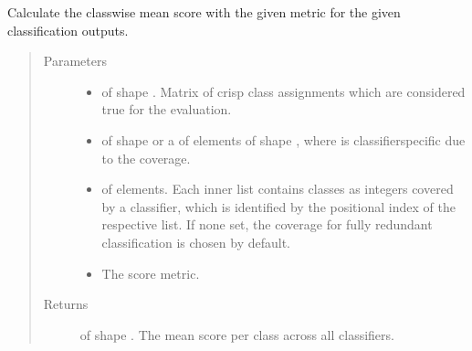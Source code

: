 \documentclass[letterpaper,10pt,english]{sphinxmanual}
\begin{document}
\begin{fulllineitems}
\begin{fulllineitems}
\label{\detokenize{pusion.evaluation.evaluation:pusion.evaluation.evaluation.Evaluation.class_wise_mean_score}}
\sphinxAtStartPar
Calculate the class\sphinxhyphen{}wise mean score with the given metric for the given classification outputs.
\begin{quote}\begin{description}
\item[{Parameters}] \leavevmode\begin{itemize}
\item {} 
\sphinxAtStartPar
{} \textendash{}  of shape .
Matrix of crisp class assignments which are considered true for the evaluation.

\item {} 
\sphinxAtStartPar
{} \textendash{}  of shape  or a  of
 elements of shape , where  is classifier\sphinxhyphen{}specific
due to the coverage.

\item {} 
\sphinxAtStartPar
{} \textendash{}  of  elements. Each inner list contains classes as integers covered by a
classifier, which is identified by the positional index of the respective list.
If none set, the coverage for fully redundant classification is chosen by default.

\item {} 
\sphinxAtStartPar
{} \textendash{} The score metric.

\end{itemize}

\item[{Returns}] \leavevmode
\sphinxAtStartPar
{} of shape . The mean score per class across all classifiers.

\end{description}\end{quote}


\end{fulllineitems}
\end{fulllineitems}
\end{document}
